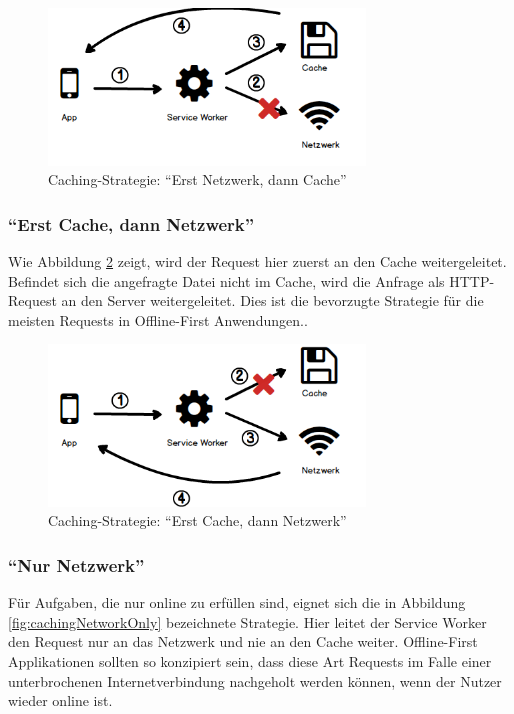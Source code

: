 \documentclass[a4paper, 12pt]{scrreprt}
\begin{document}
\begin{figure}[H]
	\centering
	\includegraphics[width=0.75\textwidth]{networkfirst.png}
	\caption{Caching-Strategie: \enquote{Erst Netzwerk, dann Cache}}
	\label{fig:cachingNetworkFirst}
\end{figure}



\subsubsection{\enquote{Erst Cache, dann Netzwerk}}
\label{sec:cachedannnetzwerk}
Wie Abbildung \ref{fig:cachingCacheFirst} zeigt, wird der Request hier zuerst an den Cache weitergeleitet. Befindet sich die angefragte Datei nicht im Cache, wird die Anfrage als \ac{HTTP}-Request an den Server weitergeleitet. Dies ist die bevorzugte Strategie für die meisten Requests in Offline-First Anwendungen.\autocite[Kapitel 05]{BookBuildingPWAs}.

\begin{figure}[H]
	\centering
	\includegraphics[width=0.75\textwidth]{cachefirst.png}
	\caption{Caching-Strategie: \enquote{Erst Cache, dann Netzwerk}}
	\label{fig:cachingCacheFirst}
\end{figure}

\subsubsection{\enquote{Nur Netzwerk}}
Für Aufgaben, die nur online zu erfüllen sind, eignet sich die in Abbildung \ref{fig:cachingNetworkOnly} bezeichnete Strategie. Hier leitet der Service Worker den Request nur an das Netzwerk und nie an den Cache weiter. Offline-First Applikationen sollten so konzipiert sein, dass diese Art Requests im Falle einer unterbrochenen Internetverbindung nachgeholt werden können, wenn der Nutzer wieder online ist.
\end{document}
